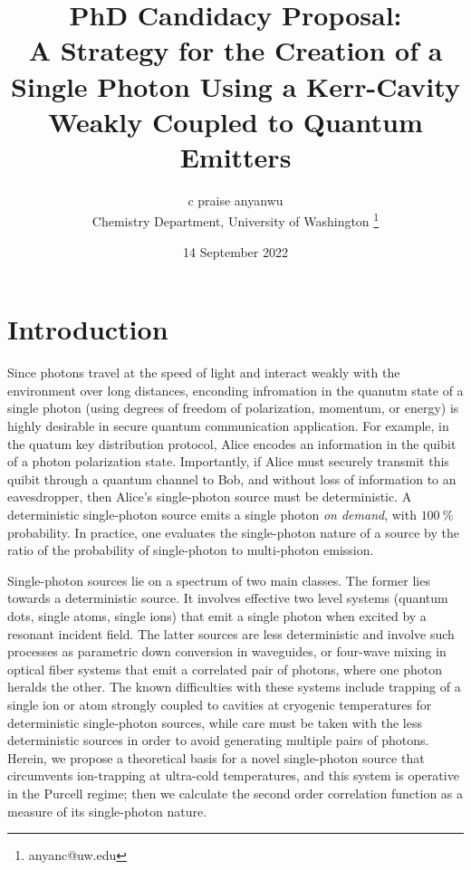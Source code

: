 \documentclass[12pt]{article}
\begin{document}
\title{PhD Candidacy Proposal: \\
A Strategy for the Creation of a Single Photon Using a Kerr-Cavity Weakly
Coupled to Quantum Emitters}
\author{c praise anyanwu \\
    Chemistry Department, University of Washington
    \thanks{anyanc@uw.edu} }
\date{14 September 2022}
\maketitle

\newpage
\section{Introduction}
Since photons travel at the speed of light and interact weakly with the
environment over long distances, enconding infromation in the quanutm state of
a single photon (using degrees of freedom of polarization, momentum, or energy)
is highly desirable in secure quantum communication application.
\cite{gisin2002quantum, bennett2004quantum} For example, in the quatum key 
distribution protocol, Alice encodes an information in the quibit of a photon 
polarization state. \cite{bennett1984proceedings, bennett1992quantum}
Importantly, if Alice must securely transmit this quibit through a quantum channel 
to Bob, and without loss of information to an eavesdropper, then Alice's 
single-photon source must be deterministic. A deterministic single-photon 
source emits a single photon \textit{on demand}, with $100 \: \%$ probability. 
In practice, one evaluates the single-photon nature of a source by the ratio of 
the probability of single-photon to multi-photon emission. \cite{lounis2005single}

Single-photon sources lie on a spectrum of two main classes.
\cite{lounis2005single, eisaman2011invited} The former lies towards a
deterministic source. It involves effective two level systems (quantum dots, 
single atoms, single ions) \cite{ShieldsAndrewJ2007Sqls, strauf2007high, 
hennrich2004photon, wilk2007single, maurer2004single} that emit a single photon 
when excited by a resonant incident field. The latter sources are less 
deterministic and involve such processes as parametric down conversion in 
waveguides, or four-wave mixing in optical fiber systems 
\cite{u2004efficient, sharping2001observation, goldschmidt2008spectrally} 
that emit a correlated pair of photons, where one photon heralds the other. 
The known difficulties with these systems include trapping of a single ion or 
atom strongly coupled to cavities at cryogenic temperatures for deterministic 
single-photon sources, while care must be taken with the less deterministic 
sources in order to avoid generating multiple pairs of photons. Herein, 
we propose a theoretical basis for a novel single-photon source that circumvents 
ion-trapping at ultra-cold temperatures, and this system is operative in the 
Purcell regime; then we calculate the second order correlation function as 
a measure of its single-photon nature.
\end{document}
